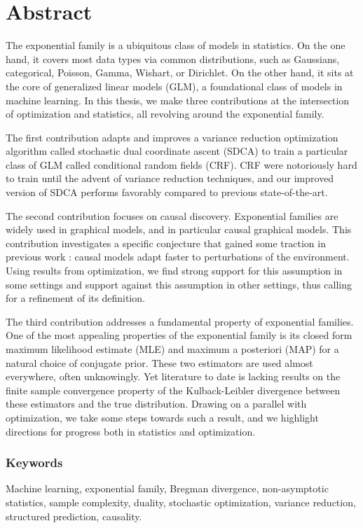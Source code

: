 \documentclass[12pt]{report} %
\numberwithin{equation}{chapter}
\numberwithin{table}{chapter}
\numberwithin{figure}{chapter}
\begin{document}
\chapter*{Abstract}

The exponential family is a ubiquitous class of models in statistics. On the one hand, it  covers most data types via common distributions, such as Gaussians, categorical, Poisson, Gamma, Wishart, or Dirichlet. On the other hand, it sits at the core of generalized linear models (GLM), a foundational class of models in machine learning. In this thesis, we make three contributions at the intersection of optimization and statistics, all revolving around the exponential family. 

The first contribution adapts and improves a variance reduction optimization algorithm called stochastic dual coordinate ascent (SDCA) to train a particular class of GLM called conditional random fields (CRF). CRF were notoriously hard to train until the advent of variance reduction techniques, and our improved version of SDCA performs favorably compared to previous state-of-the-art.  

The second contribution focuses on causal discovery. 
Exponential families are widely used in graphical models, and in particular causal graphical models. 
This contribution investigates a specific conjecture that gained some traction in previous work : causal models adapt faster to perturbations of the environment. Using results from optimization, we find strong support for this assumption in some settings and support against this assumption in other settings, thus calling for a refinement of its definition.

The third contribution addresses a fundamental property of exponential families. 
One of the most appealing properties of the exponential family is its closed form maximum likelihood estimate (MLE) and maximum a posteriori (MAP) for a natural choice of conjugate prior. These two estimators are used almost everywhere, often unknowingly. Yet literature to date is lacking results on the finite sample convergence property of the Kulback-Leibler divergence between these estimators and the true distribution. Drawing on a parallel with optimization, we take some steps towards such a result, and we highlight directions for progress both in statistics and optimization. 

\subsection*{Keywords}
Machine learning, exponential family, Bregman divergence, non-asymptotic statistics, sample complexity, duality, stochastic optimization, variance reduction, structured prediction, causality.
\end{document}

